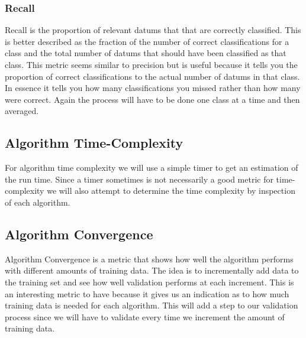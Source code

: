 \documentclass{article}
\begin{document}
			\subsubsection{Recall}
			Recall is the proportion of relevant datums that that are correctly classified. This is better described as the fraction of the number of correct classifications for a class and the total number of datums that should have been classified as that class. This metric seems similar to precision but is useful because it tells you the proportion of correct classifications to the actual number of datums in that class. In essence it tells you how many classifications you missed rather than how many were correct. Again the process will have to be done one class at a time and then averaged. 
		\subsection{Algorithm Time-Complexity}
		For algorithm time complexity we will use a simple timer to get an estimation of the run time. Since a timer sometimes is not necessarily a good metric for time-complexity we will also attempt to determine the time complexity by inspection of each algorithm.
		\subsection{Algorithm Convergence}
			\label{convergence}
		Algorithm Convergence is a metric that shows how well the algorithm performs with different amounts of training data. The idea is to incrementally add data to the training set and see how well validation performs at each increment. This is an interesting metric to have because it gives us an indication as to how much training data is needed for each algorithm. This will add a step to our validation process since we will have to validate every time we increment the amount of training data.


		
	
\end{document}
